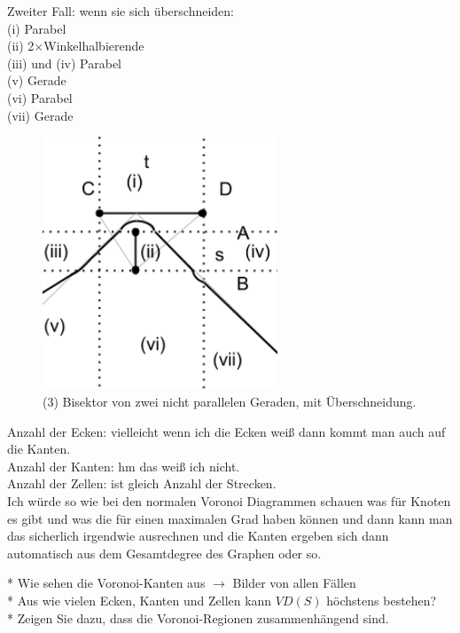 Zweiter Fall: wenn sie sich überschneiden:\\
(i) Parabel\\
(ii) 2$\times$Winkelhalbierende\\
(iii) und (iv) Parabel\\
(v) Gerade\\
(vi) Parabel\\
(vii) Gerade\\

\begin{figure}[h]
\begin{center}
\includegraphics[width=7cm]{img/ssnpin.png}
\end{center}
\caption{(3) Bisektor von zwei nicht parallelen Geraden, mit Überschneidung.}
\label{fig:a5}
\end{figure}


Anzahl der Ecken: vielleicht wenn ich die Ecken weiß dann kommt man auch auf die Kanten.\\
Anzahl der Kanten: hm das weiß ich nicht.\\
Anzahl der Zellen: ist gleich Anzahl der Strecken.\\

Ich würde so wie bei den normalen Voronoi Diagrammen schauen was für Knoten es gibt und was die für einen maximalen Grad haben können und dann kann man das sicherlich irgendwie ausrechnen und die Kanten ergeben sich dann automatisch aus dem Gesamtdegree des Graphen oder so.


* Wie sehen die Voronoi-Kanten aus $\rightarrow$ Bilder von allen Fällen\\
* Aus wie vielen Ecken, Kanten und Zellen kann $VD(S)$ höchstens bestehen?\\
* Zeigen Sie dazu, dass die Voronoi-Regionen zusammenhängend sind.